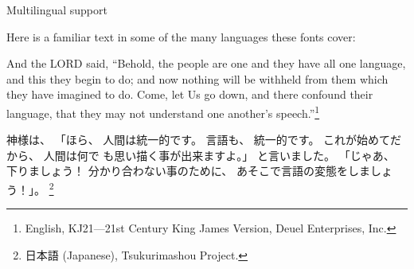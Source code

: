 \documentclass[14pt]{extarticle}
\begin{document}

\kaku

\Large
Multilingual support

\normalsize

Here is a familiar text in some of the many languages these
fonts cover:

And the LORD said, ``Behold, the people are one and they have all one
language, and this they begin to do; and now nothing will be withheld from
them which they have imagined to do.  Come, let Us go down, and there
confound their language, that they may not understand one another's
speech.''\footnote{English, KJ21---21st Century King James Version, Deuel
Enterprises, Inc.}

神様は、 「ほら、 人間は統一的です。 言語も、 統一的です。
これが始めてだから、 人間は何で
も思い描く事が出来ますよ。」
と言いました。 「じゃあ、 下りましょう！ 分かり合わない事のために、
あそこで言語の変態をしましょう！」。%
\footnote{日本語 (Japanese), Tsukurimashou Project.}
\end{document}
